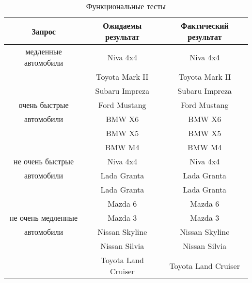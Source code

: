 \begin{table}[h]
	\begin{center}
        \begin{threeparttable}
        \captionsetup{justification=raggedright,singlelinecheck=off}
		\caption{\label{tbl:tests} Функциональные тесты}
		\begin{tabular}{|c|c|c|}
			\hline
			Запрос& Ожидаемы результат & Фактический результат \\
			\hline
            медленные автомобили & Niva 4x4 & Niva 4x4 \\
			\hline
                                     & Toyota Mark II & Toyota Mark II \\
                                     & Subaru Impreza & Subaru Impreza \\
            очень быстрые            & Ford Mustang & Ford Mustang \\
              автомобили             & BMW X6 & BMW X6 \\
                                     & BMW X5 & BMW X5 \\
                                     & BMW M4 & BMW M4 \\
            \hline
            не очень быстрые & Niva 4x4 & Niva 4x4 \\
              автомобили       & Lada Granta & Lada Granta \\
            \hline
                                     & Lada Granta & Lada Granta \\
                                     & Mazda 6 & Mazda 6 \\
            не очень медленные       & Mazda 3 & Mazda 3 \\
              автомобили             & Nissan Skyline & Nissan Skyline \\
                                     & Nissan Silvia & Nissan Silvia \\
                                     & Toyota Land Cruiser & Toyota Land Cruiser \\
            \hline
		\end{tabular}
        \end{threeparttable}
	\end{center}
\end{table}
\FloatBarrier